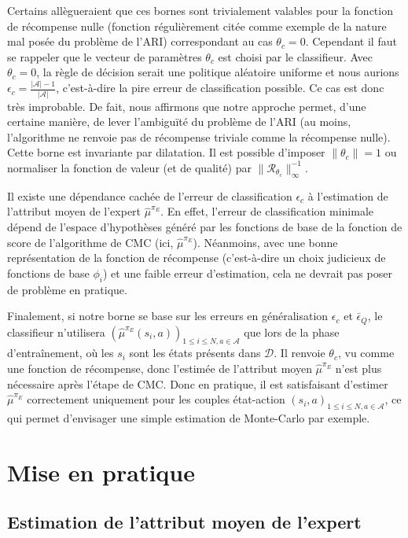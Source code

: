 \documentclass[english,utf8]{./hermes-journal}
\newcommand{\R}{\mathcal{R}}
\newcommand{\A}{\mathcal{A}}
\newcommand{\D}{\mathcal{D}}
\begin{document}
Certains allègueraient que ces bornes sont trivialement valables pour la fonction de récompense nulle (fonction régulièrement citée comme exemple de la nature mal posée du problème de l'ARI) correspondant au cas $\theta_c=0$. Cependant il faut se rappeler que le vecteur de paramètres $\theta_c$ est choisi par le classifieur. Avec 
$\theta_c=0$, la règle de décision serait une politique aléatoire uniforme et nous aurions $\epsilon_c = \frac{|\A|-1}{|\A|}$, c'est-à-dire la pire erreur de classification possible. Ce cas est donc très improbable. De fait, nous affirmons que notre approche permet, d'une certaine manière, de lever l'ambiguïté du problème de l'ARI (au moins, l'algorithme ne renvoie pas de récompense triviale comme la récompense nulle).
%
Cette borne est invariante par dilatation. Il est possible d'imposer 
$\|\theta_c\|=1$ ou normaliser la fonction de valeur (et de qualité) par 
$\|\R_{\theta_c}\|_\infty^{-1}$.

Il existe une dépendance cachée de l'erreur de classification  $\epsilon_c$ à l'estimation de l'attribut moyen de l'expert  $\hat{\mu}^{\pi_E}$. En effet, l'erreur de classification minimale dépend de l'espace d'hypothèses généré par les fonctions de base de la fonction de score de l'algorithme de CMC (ici, 
$\hat{\mu}^{\pi_E}$). Néanmoins, avec une bonne représentation de la fonction de récompense (c'est-à-dire un choix judicieux de fonctions de base $\phi_i$) et une faible erreur d'estimation, cela ne devrait pas poser de problème en pratique.

Finalement, si notre borne se base sur les erreurs en généralisation 
$\epsilon_c$ et $\bar{\epsilon}_Q$, le classifieur n'utilisera 
$(\hat{\mu}^{\pi_E}(s_i,a))_{1\leq i\leq N,a\in\A}$ que lors de la phase d'entraînement, où les $s_i$ sont les états présents dans $\D$. Il renvoie 
$\theta_c$, vu comme une fonction de récompense, donc l'estimée de l'attribut moyen $\hat{\mu}^{\pi_E}$ n'est plus nécessaire après l'étape de CMC. Donc en pratique, il est satisfaisant d'estimer 
$\hat{\mu}^{\pi_E}$ correctement uniquement pour les couples état-action $(s_i,a)_{1\leq i\leq
N,a\in\A}$, ce qui permet d'envisager une simple estimation de Monte-Carlo par exemple.

\section{Mise en pratique}
\label{sec:practicalApproach}

\subsection{Estimation de l'attribut moyen de l'expert}
\label{subsec:practicalApproach:muE}
\end{document}
